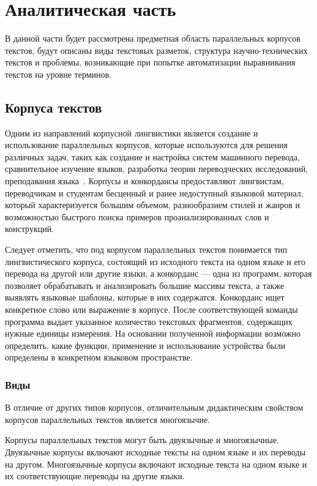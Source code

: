 \section{Аналитическая часть}

В данной части будет рассмотрена предметная область параллельных корпусов текстов, будут описаны виды текстовых разметок, структура научно-технических текстов и проблемы, возникающие при попытке автоматизации выравнивания текстов на уровне терминов.

\subsection{Корпуса текстов}

Одним из направлений корпусной лингвистики является создание и использование параллельных корпусов, которые используются для решения различных задач, таких как создание и настройка систем машинного перевода, сравнительное изучение языков, разработка теории переводческих исследований, преподавания языка~\cite{butenko2020-9}.
Корпусы и конкордансы предоставляют лингвистам, переводчикам и студентам бесценный и ранее недоступный языковой материал, который характеризуется большим объемом, разнообразием стилей и жанров и возможностью быстрого поиска примеров проанализированных слов и конструкций.~\cite{butenko2020-1}

Следует отметить, что под корпусом параллельных текстов понимается тип лингвистического корпуса, состоящий из исходного текста на одном языке и его перевода на другой или другие языки, а конкорданс --- одна из программ, которая позволяет обрабатывать и анализировать большие массивы текста, а также выявлять языковые шаблоны, которые в них содержатся.
Конкорданс ищет конкретное слово или выражение в корпусе.
После соответствующей команды программа выдает указанное количество текстовых фрагментов, содержащих нужные единицы измерения.
На основании полученной информации возможно определить, какие функции, применение и использование устройства были определены в конкретном языковом пространстве.~\cite{butenko2020-1}

\subsubsection{Виды}

В отличие от других типов корпусов, отличительным дидактическим свойством корпусов параллельных текстов является многоязычие.

Корпусы параллельных текстов могут быть двуязычные и многоязычные.
Двуязычные корпусы включают исходные тексты на одном языке и их переводы на другом.
Многоязычные корпусы включают исходные текста на одном языке и их соответствующие переводы на другие языки.


